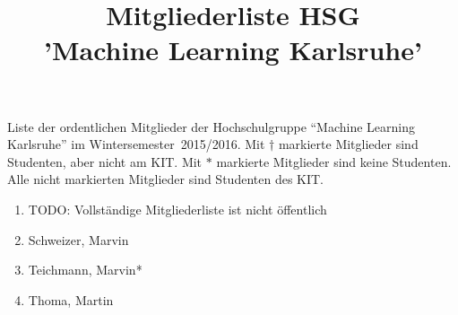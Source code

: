\documentclass[a4paper]{article}
\title{Mitgliederliste HSG\\'Machine Learning Karlsruhe'}
\begin{document}
\maketitle
\thispagestyle{fancy}

Liste der ordentlichen Mitglieder der Hochschulgruppe \enquote{Machine Learning
Karlsruhe} im Wintersemester~2015/2016. Mit $\dagger$ markierte Mitglieder
sind Studenten, aber nicht am KIT. Mit $\ast$ markierte Mitglieder sind keine
Studenten. Alle nicht markierten Mitglieder sind Studenten des KIT.

\begin{enumerate}
    \item TODO: Vollständige Mitgliederliste ist nicht öffentlich
    \item Schweizer, Marvin
    \item Teichmann, Marvin*
    \item Thoma, Martin
\end{enumerate}
\end{document}
